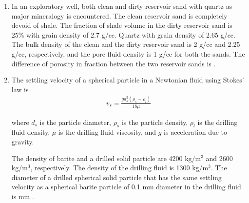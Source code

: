\documentclass[journal,12pt,onecolumn]{IEEEtran}
\theoremstyle{remark}
\begin{document}
\begin{enumerate}
 \item In an exploratory well, both clean and dirty reservoir sand with quartz as major mineralogy is encountered. The clean reservoir sand is completely devoid of shale. The fraction of shale volume  in the dirty reservoir sand is 25\% with grain density  of 2.7 g/cc. Quartz  with grain density  of 2.65 g/cc. The bulk density  of the clean and the dirty reservoir sand is 2 g/cc and 2.25 g/cc, respectively, and the pore fluid density  is 1 g/cc for both the sands. The difference of porosity  in fraction between the two reservoir sands is \underline{\hspace{1cm}} .
\begin{enumerate}
\end{enumerate}
\hfill{}



\item  The settling velocity  of a spherical particle in a Newtonian fluid using Stokes' law is
\begin{align}
   v_s = \frac{g d_s^2 (\rho_s - \rho_l)}{18 \mu} 
\end{align}


where $d_s$ is the particle diameter, $\rho_s$ is the particle density, $\rho_l$ is the drilling fluid density, $\mu$ is the drilling fluid viscosity, and $g$ is acceleration due to gravity.

The density of barite and a drilled solid particle are 4200 kg/m$^3$ and 2600 kg/m$^3$, respectively. The density of the drilling fluid is 1300 kg/m$^3$. The diameter of a drilled spherical solid particle that has the same settling velocity as a spherical barite particle of 0.1 mm diameter in the drilling fluid is \underline{\hspace{1cm}} mm .
\begin{enumerate}
\end{enumerate}
\hfill{}




\end{enumerate}
\end{document}
